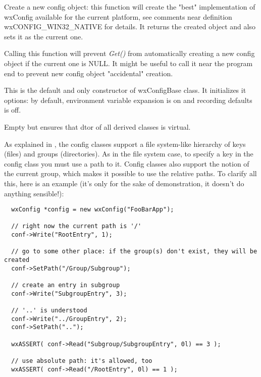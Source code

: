 
Create a new config object: this function will create the "best"
implementation of wxConfig available for the current platform, see
comments near definition wxCONFIG\_WIN32\_NATIVE for details. It returns
the created object and also sets it as the current one.


Calling this function will prevent {\it Get()} from automatically creating a
new config object if the current one is NULL. It might be useful to call it
near the program end to prevent new config object "accidental" creation.



This is the default and only constructor of wxConfigBase class. It initializes
it options: by default, environment variable expansion is on and recording
defaults is off.
 

Empty but ensures that dtor of all derived classes is virtual.


As explained in , the config classes
support a file system-like hierarchy of keys (files) and groups (directories).
As in the file system case, to specify a key in the config class you must use
a path to it. Config classes also support the notion of the current group,
which makes it possible to use the relative paths. To clarify all this, here
is an example (it's only for the sake of demonstration, it doesn't do anything
sensible!):

\begin{verbatim}
  wxConfig *config = new wxConfig("FooBarApp");

  // right now the current path is '/'
  conf->Write("RootEntry", 1);

  // go to some other place: if the group(s) don't exist, they will be created
  conf->SetPath("/Group/Subgroup");

  // create an entry in subgroup
  conf->Write("SubgroupEntry", 3);
  
  // '..' is understood
  conf->Write("../GroupEntry", 2);
  conf->SetPath("..");

  wxASSERT( conf->Read("Subgroup/SubgroupEntry", 0l) == 3 );

  // use absolute path: it's allowed, too
  wxASSERT( conf->Read("/RootEntry", 0l) == 1 );
\end{verbatim}

